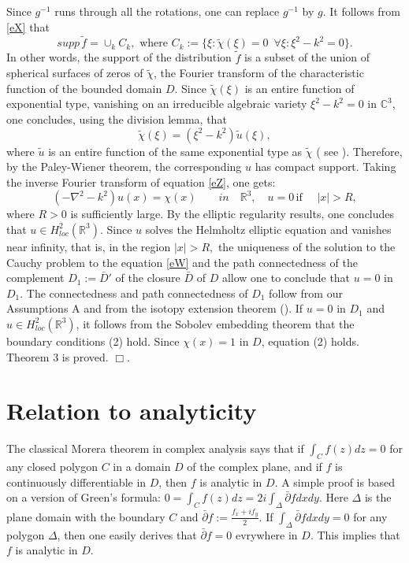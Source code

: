\documentclass[12pt,leqno]{article}
\def\R{\mathbb{R}}
\def\C{\mathbb{C}}
\begin{document}
 Since $g^{-1}$
runs through all the rotations, one can replace $g^{-1}$ by $g$. It
follows from \eqref{eX} that
\begin{equation}
\label{eY}
supp\, \tilde{f}=\cup_{k} C_k,\,\, \text {where} \,\, C_k:=\{\xi:
\tilde{\chi}(\xi)=0\,\,\, \forall \xi: \xi^2-k^2=0\}.
\end{equation}
 In other
words, the support of the distribution $\tilde{f}$ is a subset of
the union of spherical surfaces of zeros of $\tilde{\chi}$, the
Fourier transform of the characteristic function of the bounded
domain $D$.
 Since $\tilde{\chi}(\xi)$ is an entire
function of exponential type, vanishing on an irreducible algebraic
variety $\xi^2-k^2=0$ in $\C^3$, one concludes, using the division
lemma, that
\begin{equation}
\label{eZ}
\tilde{\chi}(\xi)=(\xi^2-k^2)\tilde{u}(\xi),
\end{equation}
 where $\tilde{u}$ is
an entire function of the same exponential type as $\tilde{\chi}$ (
see \cite{F}). Therefore, by the Paley-Wiener theorem, the
corresponding $u$ has compact support. Taking the inverse Fourier
transform of equation \eqref{eZ}, one gets:
\begin{equation}
\label{eW}
(-\nabla^2-k^2)u(x)=\chi(x)   \qquad in\quad \R^3, \quad u=0\, \text{if}\,\,
\quad |x|>R,
\end{equation}
 where $R>0$ is sufficiently large. By the elliptic
regularity results,  one concludes that  $u\in H^2_{loc}(\R^3)$.
Since $u$ solves the Helmholtz elliptic equation and vanishes near
infinity, that is, in the region  $|x|>R,$ the uniqueness of the
solution to the Cauchy problem to the equation \eqref{eW} and  the
path connectedness of the complement $D_1:=\bar{D}'$ of the closure
$\bar{D}$ of $D$ allow one to conclude that $u=0$ in $D_1$. The
connectedness and path connectedness of $D_1$ follow from our
Assumptions A and from the isotopy extension theorem (\cite{H}). If
$u=0$ in $D_1$ and $u\in H^2_{loc}(\R^3)$, it follows from the
Sobolev embedding theorem that the boundary conditions (2) hold.
Since $\chi(x)=1$ in $D$, equation (2) holds. Theorem 3 is proved.
\hfill $\Box$.

\section{Relation to analyticity}
The classical Morera theorem in complex analysis says
that if $\int_Cf(z)dz=0$ for any closed polygon $C$ in a domain $D$
of the complex plane, and if $f$ is continuously differentiable in $D$,
then $f$ is analytic in $D$. A simple proof is based on a version of
Green's formula: $0=\int_Cf(z)dz= 2i \int_{\Delta}\bar{\partial}f dxdy$.
Here $\Delta$ is the plane domain with the boundary $C$ and
$\bar{\partial}f:=\frac{f_x+if_y}{2}$. If $\int_{\Delta}\bar{\partial}f
dxdy=0$ for any polygon $\Delta$, then one easily derives that
$\bar{\partial}f=0$ evrywhere in $D$. This implies that $f$ is analytic in
$D$.
\end{document}
